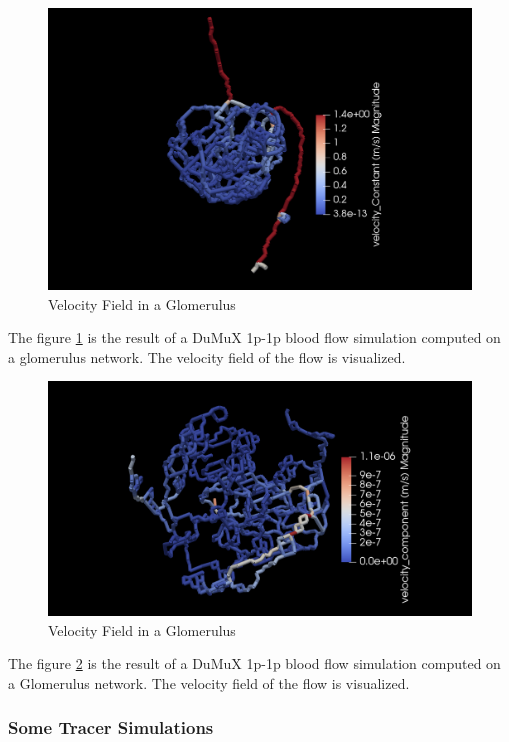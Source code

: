 \begin{figure}[h]
\centering
\includegraphics[width=162mm]{nephron_velocity}
\caption{Velocity Field in a Glomerulus}
\label{fig:nephron_velocity}
\end{figure}
The figure \ref{fig:nephron_velocity} is the result of a DuMuX 1p-1p blood flow simulation computed on a glomerulus network. The velocity field of the flow is visualized.\\

\begin{figure}[h]
\centering
\includegraphics[width=162mm]{nephron2_velocity}
\caption{Velocity Field in a Glomerulus}
\label{fig:nephron2_velocity}
\end{figure}
The figure \ref{fig:nephron2_velocity} is the result of a DuMuX 1p-1p blood flow simulation computed on a Glomerulus network. The velocity field of the flow is visualized.\\

\subsubsection*{Some Tracer Simulations}

